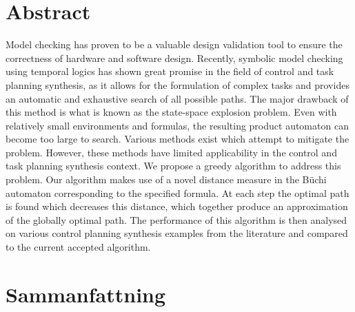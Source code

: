 \section*{\centering Abstract}
Model checking has proven to be a valuable design validation tool to ensure the correctness of hardware and software design. Recently, symbolic model checking using temporal logics has shown great promise in the field of control and task planning synthesis, as it allows for the formulation of complex tasks and provides an automatic and exhaustive search of all possible paths. The major drawback of this method is what is known as the state-space explosion problem. Even with relatively small environments and formulas, the resulting product automaton can become too large to search. Various methods exist which attempt to mitigate the problem. However, these methods have limited applicability in the control and task planning synthesis context. We propose a greedy algorithm to address this problem. Our algorithm makes use of a novel distance measure in the B\"uchi automaton corresponding to the specified formula. At each step the optimal path is found which decreases this distance, which together produce an approximation of the globally optimal path. The performance of this algorithm is then analysed on various control planning synthesis examples from the literature and compared to the current accepted algorithm.     





\newpage

\section*{\centering Sammanfattning}

